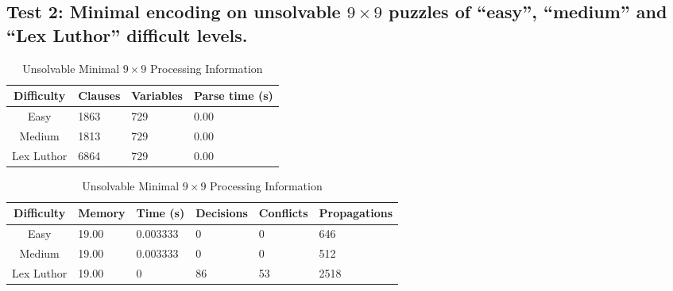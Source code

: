 \documentclass[conference,draftclsnofoot]{IEEEtran}
\begin{document}
\subsection{Test 2: Minimal encoding on unsolvable $9 \times 9$ puzzles of ``easy'',
``medium'' and ``Lex Luthor'' difficult levels.}
\FloatBarrier
\begin{table}[htbp]
	\centering
	\begin{tabular}{c | l l l}
		Difficulty & Clauses & Variables & Parse time (s) \\\hline
		Easy 		& 1863 & 729 & 0.00 \\
		Medium 		& 1813 & 729 & 0.00 \\
		Lex Luthor 	& 6864 & 729 & 0.00
	\end{tabular}
	\caption{Unsolvable Minimal $9 \times 9$ Parse Information}
	\label{tab:summary}
	\begin{tabular}{c | l l p{20pt} p{20pt}  l }
		Difficulty & Memory & Time (s) & Decisions &
		Conflicts & Propagations \\\hline
		Easy 		& 19.00 & 0.003333 & 0  & 0  & 646 \\
		Medium 		& 19.00 & 0.003333 & 0  & 0  & 512 \\
		Lex Luthor 	& 19.00 & 0 	   & 86 & 53 & 2518
	\end{tabular}
	\caption{Unsolvable Minimal $9 \times 9$ Processing Information}
	\label{tab:summary}
\end{table}
\FloatBarrier
\end{document}
